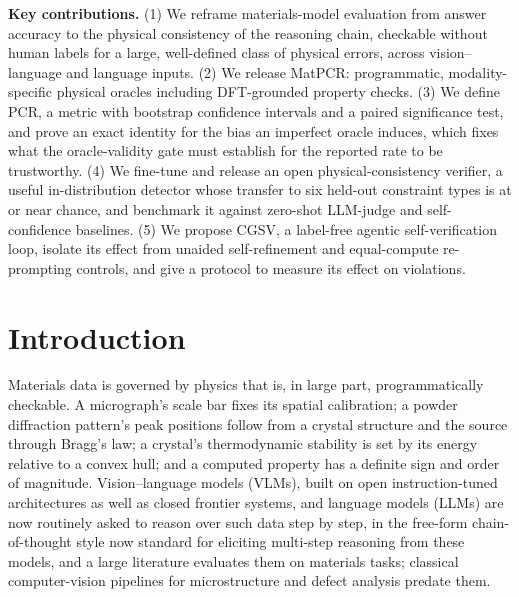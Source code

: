 \documentclass[pdflatex,sn-nature]{sn-jnl}
\begin{document}
\noindent\begin{tcolorbox}[colback=gray!6,colframe=gray!50,boxrule=0.5pt]
\textbf{Key contributions.} (1) We reframe materials-model evaluation from answer accuracy to the physical
consistency of the reasoning chain, checkable without human labels for a large,
well-defined class of physical errors, across vision--language and language inputs. (2) We release MatPCR: programmatic,
modality-specific physical oracles including DFT-grounded property checks. (3) We
define PCR, a metric with bootstrap confidence intervals and a paired significance
test, and prove an exact identity for the bias an imperfect oracle induces, which fixes
what the oracle-validity gate must establish for the reported rate to be trustworthy.
(4) We fine-tune and release an open physical-consistency verifier, a useful
in-distribution detector whose transfer to six held-out constraint types is at or near
chance,
and benchmark it against zero-shot LLM-judge and self-confidence baselines. (5) We
propose CGSV, a label-free agentic self-verification loop, isolate its effect from
unaided self-refinement and equal-compute re-prompting controls, and give a protocol to measure
its effect on violations.
\end{tcolorbox}

\section*{Introduction}
Materials data is governed by physics that is, in large part, programmatically
checkable. A micrograph's scale bar fixes its spatial calibration; a powder
diffraction pattern's peak positions follow from a crystal structure and the source
through Bragg's law; a crystal's thermodynamic stability is set by its energy
relative to a convex hull; and a computed property has a definite sign and order of
magnitude. Vision--language models (VLMs), built on open instruction-tuned
architectures\cite{liu2024llava} as well as closed frontier systems, and language
models (LLMs) are now
routinely asked to reason over such data step by step, in the free-form
chain-of-thought style now standard for eliciting multi-step reasoning from these
models,\cite{wei2022cot} and a large literature evaluates them on
materials tasks;\cite{lai2025materials,npj2026vlmeval,choudhary2025microscopygpt,li2024mmsci}
classical computer-vision pipelines for microstructure and defect analysis predate
them.\cite{holm2020cv,li2018defect}
\end{document}
